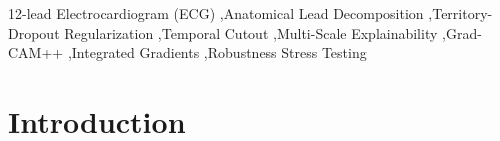 \documentclass[12pt]{elsarticle}
\begin{document}
\begin{frontmatter}
\begin{abstract}
and Normal controls ($N=963$) demonstrate balanced physiological equilibrium ($\Delta P = 0.117$). External zero-shot validation on 6,877 CPSC2018 records confirms robust out-of-distribution transferability (Macro ROC-AUC = \textbf{0.7849}, Normal Sinus Rhythm = \textbf{0.9049}).
\end{abstract}

% 

\begin{keyword}
12-lead Electrocardiogram (ECG) \sep Anatomical Lead Decomposition \sep Territory-Dropout Regularization \sep Temporal Cutout \sep Multi-Scale Explainability \sep Grad-CAM++ \sep Integrated Gradients \sep Robustness Stress Testing
\end{keyword}

\end{frontmatter}

\section{Introduction}
\label{sec:intro}
\end{document}
